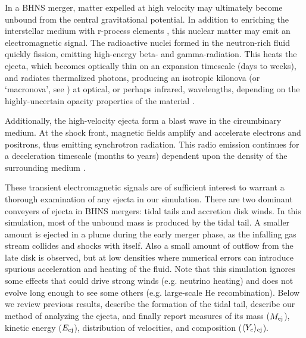 In a BHNS merger, matter expelled at high velocity
may ultimately become unbound from the central gravitational potential.
In addition to enriching the interstellar medium with r-process elements
\citep{latt1974-bhns_ejecta,frei1999-r_process,arno2007-r_process,koro2012-r_process},
this nuclear matter may emit an electromagnetic signal.
The radioactive nuclei formed in the neutron-rich fluid
quickly fission, emitting high-energy beta- and gamma-radiation.
This heats the ejecta, which becomes optically thin on an expansion
timescale (days to weeks), and radiates thermalized photons, producing
an isotropic kilonova (or `macronova', see
\citealt{li1998-transients,robe2011-transients,metz2012-most_promising,ross2012-ejecta,
pira2013-em_counterparts,kase2013-opacities,niss2012-end_to_end})
at optical, or perhaps infrared, wavelengths, depending on the highly-uncertain
opacity properties of the material \citep{kase2013-opacities}.

Additionally, the high-velocity ejecta form a blast wave in the circumbinary medium.
At the shock front, magnetic fields amplify and accelerate electrons and positrons,
thus emitting synchrotron radiation.
This radio emission continues for a deceleration timescale (months to years)
dependent upon the density of the surrounding medium
\citep{metz2012-most_promising,naka2011-radio,pira2013-em_counterparts,niss2012-end_to_end}.

These transient electromagnetic signals are of sufficient interest
to warrant a thorough examination of any ejecta in our simulation.
There are two dominant conveyers of ejecta in BHNS mergers:
tidal tails and accretion disk winds.  In this simulation, most of
the unbound mass is produced by the tidal tail.  A smaller amount is
ejected in a plume during the early merger phase, as the infalling gas stream
collides and shocks with itself. Also a small amount of outflow from the late disk
is observed, but at low densities where numerical errors can introduce
spurious acceleration and heating of the fluid.
Note that this simulation ignores some effects that could drive
strong winds (e.g. neutrino heating) and does not evolve long enough to
see some others (e.g. large-scale He recombination).
Below we review previous results, describe the formation of the tidal tail,
describe our method of analyzing the ejecta, and finally report measures of
its mass ($M_{\rm ej}$), kinetic energy ($E_{\rm ej}$),
distribution of velocities, and composition ($\langle Y_e \rangle_{\rm ej}$).

